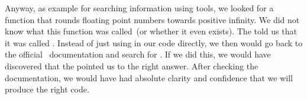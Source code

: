 \begin{noglslink}
Anyway, as example for searching information using  tools, we looked for a function that rounds floating point numbers towards positive infinity.
We did not know what this function was called~(or whether it even exists).
The  told us that it was called .
Instead of just using  in our code directly, we then would go back to the official \python\ documentation and search for .
If we did this, we would have discovered that the  pointed us to the right answer.
After checking the documentation, we would have had absolute clarity and confidence that we will produce the right code.%
\FloatBarrier%
\end{noglslink}%
\endhsection%
%
